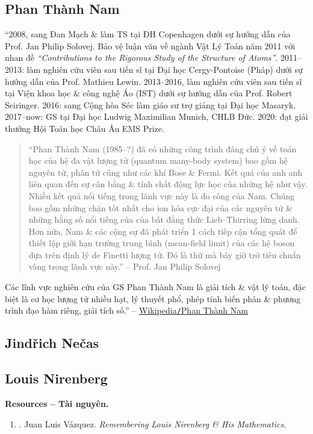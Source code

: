 \documentclass{article}
\begin{document}
\subsection{Phan Thành Nam}
``2008, sang Đan Mạch \& làm TS tại ĐH Copenhagen dưới sự hướng dẫn của Prof. {\sc Jan Philip Solovej}. Bảo vệ luận văn về ngành Vật Lý Toán năm 2011 với nhan đề {\it``Contributions to the Rigorous Study of the Structure of Atoms''}. 2011--2013: làm nghiên cứu viên sau tiến sĩ tại Đại học Cergy-Pontoise (Pháp) dưới sự hướng dẫn của Prof. {\sc Mathieu Lewin}. 2013--2016,  làm nghiên cứu viên sau tiến sĩ tại Viện khoa học \& công nghệ Áo (IST) dưới sự hướng dẫn của Prof. {\sc Robert Seiringer}. 2016: sang Cộng hòa Séc làm giáo sư trợ giảng tại Đại học Masaryk. 2017--now: GS tại Đại học Ludwig Maximilian Munich, CHLB Đức. 2020: đạt giải thưởng Hội Toán học Châu Âu EMS Prize.
\begin{quotation}
	``{\sc Phan Thành Nam} (1985--?) đã có những công trình đáng chú ý về toán học của hệ đa vật lượng tử (quantum many-body system) bao gồm hệ nguyên tử, phân tử cũng như các khí Bose \& Fermi. Kết quả của anh anh liên quan đến sự cân bằng \& tính chất động lực học của những hệ như vậy. Nhiều kết quả nổi tiếng trong lãnh vực này là do công của Nam. Chúng bao gồm những chặn tốt nhất cho ion hóa cực đại của các nguyên tử \& những hằng số nổi tiếng của của bất đẳng thức Lieb--Thirring lừng danh. Hơn nữa, Nam \& các cộng sự đã phát triển 1 cách tiếp cận tổng quát để thiết lập giới hạn trường trung bình (mean-field limit) của các hệ boson dựa trên định lý de Finetti lượng tử. Đó là thứ mà bây giờ trở tiêu chuẩn vàng trong lãnh vực này.'' -- Prof. {\sc Jan Philip Solovej}
\end{quotation}
Các lĩnh vực nghiên cứu của GS Phan Thành Nam là giải tích \& vật lý toán, đặc biệt là cơ học lượng tử nhiều hạt, lý thuyết phổ, phép tính biến phân \& phương trình đạo hàm riêng, giải tích số.'' -- \href{https://vi.wikipedia.org/wiki/Phan_Th%C3%A0nh_Nam}{Wikipedia{\tt/}Phan Thành Nam}


\subsection{Jind\v{r}ich Ne\v{c}as}


\subsection{Louis Nirenberg}
\textbf{\textsf{Resources -- Tài nguyên.}}
\begin{enumerate}
	\item \cite{Vazquez_remember_Nirenberg}. {\sc Juan Luis V\'{a}zquez}. {\it Remembering Louis Nirenberg \& His Mathematics}.
\end{enumerate}
\end{document}
